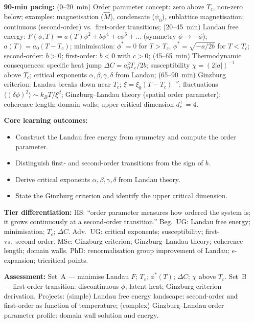 \documentclass[11pt,a4paper]{article}
\begin{document}
\medskip

\begin{tcolorbox}[modulebox, title={Module~II.7 --- Lecture L08: Phase Transitions I --- Landau Theory}]
\textbf{90-min pacing:} (0--20~min) Order parameter concept: zero above $T_c$, non-zero below; examples: magnetisation ($\hat{M}$), condensate ($\psi_0$), sublattice magnetisation; continuous (second-order) vs.\ first-order transitions; (20--45~min) Landau free energy: $F(\phi,T)=a(T)\phi^2+b\phi^4+c\phi^6+\ldots$ (symmetry $\phi\to-\phi$); $a(T)=a_0(T-T_c)$; minimisation: $\phi^*=0$ for $T>T_c$, $\phi^*=\sqrt{-a/2b}$ for $T<T_c$; second-order: $b>0$; first-order: $b<0$ with $c>0$; (45--65~min) Thermodynamic consequences: specific heat jump $\Delta C=a_0^2T_c/2b$; susceptibility $\chi=(2|a|)^{-1}$ above $T_c$; critical exponents $\alpha,\beta,\gamma,\delta$ from Landau; (65--90~min) Ginzburg criterion: Landau breaks down near $T_c$; $\xi=\xi_0(T-T_c)^{-\nu}$; fluctuations $\langle(\delta\phi)^2\rangle\sim k_BT/\xi^d$; Ginzburg--Landau theory (spatial order parameter); coherence length; domain walls; upper critical dimension $d_c^+=4$.

\medskip\textbf{Core learning outcomes:}
\begin{itemize}[leftmargin=1.4em,topsep=2pt,itemsep=1pt]
  \item Construct the Landau free energy from symmetry and compute the order parameter.
  \item Distinguish first- and second-order transitions from the sign of $b$.
  \item Derive critical exponents $\alpha,\beta,\gamma,\delta$ from Landau theory.
  \item State the Ginzburg criterion and identify the upper critical dimension.
\end{itemize}

\medskip\textbf{Tier differentiation:}
HS: ``order parameter measures how ordered the system is; it grows continuously at a second-order transition.''
Beg.\ UG: Landau free energy; minimisation; $T_c$; $\Delta C$.
Adv.\ UG: critical exponents; susceptibility; first- vs.\ second-order.
MSc: Ginzburg criterion; Ginzburg--Landau theory; coherence length; domain walls.
PhD: renormalisation group improvement of Landau; $\epsilon$-expansion; tricritical points.

\medskip\textbf{Assessment:}
Set~A --- minimise Landau $F$; $T_c$; $\phi^*(T)$; $\Delta C$; $\chi$ above $T_c$.
Set~B --- first-order transition: discontinuous $\phi$; latent heat; Ginzburg criterion derivation.
Projects: (simple) Landau free energy landscape: second-order and first-order as function of temperature;
(complex) Ginzburg--Landau order parameter profile: domain wall solution and energy.
\end{tcolorbox}
\end{document}
